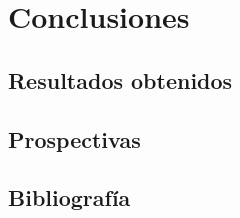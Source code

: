 
\chapter{Conclusiones} %

\pagebreak
\section{Resultados obtenidos}

\pagebreak
\section{Prospectivas}

\pagebreak
\section{Bibliografía}